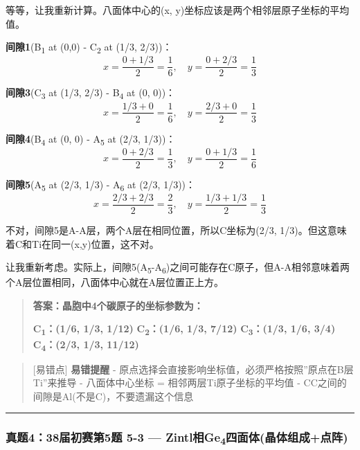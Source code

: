 \documentclass[a4paper,11pt]{ctexart}
\newcommand{\箭}{\ensuremath{\rightarrow}}
\newcommand{\左箭}{\ensuremath{\leftarrow}}
\newcommand{\上箭}{\ensuremath{\uparrow}}
\newcommand{\下箭}{\ensuremath{\downarrow}}
\newcommand{\衡}{\ensuremath{\rightleftharpoons}}
\newcommand{\双箭}{\ensuremath{\leftrightarrow}}
\newcommand{\约等于}{\ensuremath{\approx}}
\newcommand{\小于等于}{\ensuremath{\leq}}
\newcommand{\大于等于}{\ensuremath{\geq}}
\newcommand{\不等于}{\ensuremath{\neq}}
\newcommand{\西格马}{\ensuremath{\sigma}}
\newcommand{\派}{\ensuremath{\pi}}
\begin{document}
等等，让我重新计算。八面体中心的(x, y)坐标应该是两个相邻层原子坐标的平均值。

\textbf{间隙1}(B\textsubscript{1} at (0,0) - C\textsubscript{2} at (1/3, 2/3))：
\[x = \frac{0 + 1/3}{2} = \frac{1}{6}, \quad y = \frac{0 + 2/3}{2} = \frac{1}{3}\]

\textbf{间隙3}(C\textsubscript{3} at (1/3, 2/3) - B\textsubscript{4} at (0, 0))：
\[x = \frac{1/3 + 0}{2} = \frac{1}{6}, \quad y = \frac{2/3 + 0}{2} = \frac{1}{3}\]

\textbf{间隙4}(B\textsubscript{4} at (0, 0) - A\textsubscript{5} at (2/3, 1/3))：
\[x = \frac{0 + 2/3}{2} = \frac{1}{3}, \quad y = \frac{0 + 1/3}{2} = \frac{1}{6}\]

\textbf{间隙5}(A\textsubscript{5} at (2/3, 1/3) - A\textsubscript{6} at (2/3, 1/3))：
\[x = \frac{2/3 + 2/3}{2} = \frac{2}{3}, \quad y = \frac{1/3 + 1/3}{2} = \frac{1}{3}\]

不对，间隙5是A-A层，两个A层在相同位置，所以C坐标为(2/3, 1/3)。但这意味着C和Ti在同一(x,y)位置，这不对。

让我重新考虑。实际上，间隙5(A\textsubscript{5}-A\textsubscript{6})之间可能存在C原子，但A-A相邻意味着两个A层位置相同，八面体中心就在A层位置正上方。

\begin{quote}
\textbf{答案：晶胞中4个碳原子的坐标参数为：}

\textbf{C\textsubscript{1}：(1/6, 1/3, 1/12)}
\textbf{C\textsubscript{2}：(1/6, 1/3, 7/12)}
\textbf{C\textsubscript{3}：(1/3, 1/6, 3/4)}
\textbf{C\textsubscript{4}：(2/3, 1/3, 11/12)}
\end{quote}

\begin{quote}
{[}易错点{]} \textbf{易错提醒}
- 原点选择会直接影响坐标值，必须严格按照''原点在B层Ti''来推导
- 八面体中心坐标 = 相邻两层Ti原子坐标的平均值
- CC之间的间隙是Al(不是C)，不要遗漏这个信息
\end{quote}

\begin{center}\rule{0.5\linewidth}{0.5pt}\end{center}

\subsubsection{\texorpdfstring{真题4：38届初赛第5题 5-3 --- Zintl相Ge\textsubscript{4}四面体(晶体组成+点阵)}{真题4：38届初赛第5题 5-3 --- Zintl相Ge4四面体(晶体组成+点阵)}}\label{ux771fux9898438ux5c4aux521dux8d5bux7b2c5ux9898-5-3-zintlux76f8ge4ux56dbux9762ux4f53ux6676ux4f53ux7ec4ux6210ux70b9ux9635}
\end{document}
